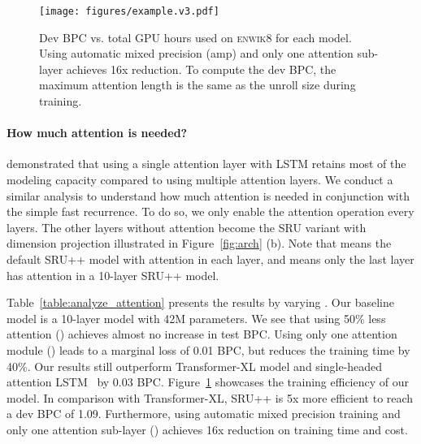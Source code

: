 \documentclass[11pt,a4paper]{article}
\begin{document}
\begin{figure}[t!]
\texttt{[image: figures/example.v3.pdf]}
    \caption{Dev BPC vs. total GPU hours used on \textsc{enwik8} for each model. 
Using automatic mixed precision (amp) and only one attention sub-layer achieves 16x reduction.
    To compute the dev BPC, the maximum attention length is the same as the unroll size  during training.}
    \label{fig:enwik8_base}
\end{figure}

\paragraph{How much attention is needed?}
\citet{merity2019single} demonstrated that using a single attention layer with LSTM retains most of the modeling capacity compared to using multiple attention layers.
We conduct a similar analysis to understand how much attention is needed in conjunction with the simple fast recurrence.
To do so, we only enable the attention operation every  layers.
The other layers without attention become the SRU variant with dimension projection illustrated in Figure~\ref{fig:arch} (b).
Note that  means the default SRU++ model with attention in each layer, and  means only the last layer has attention in a 10-layer SRU++ model.

Table~\ref{table:analyze_attention} presents the results by varying .
Our baseline model is a 10-layer model with 42M parameters.
We see that using 50\% less attention () achieves almost no increase in test BPC.
Using only one attention module () leads to a marginal loss of 0.01 BPC, but reduces the training time by 40\%. 
Our results still outperform Transformer-XL model and single-headed attention LSTM~\cite{merity2019single} by 0.03 BPC.
Figure~\ref{fig:enwik8_base} showcases the training efficiency of our model.
In comparison with Transformer-XL, SRU++ is 5x more efficient to reach a dev BPC of 1.09.
Furthermore, using automatic mixed precision training and only one attention sub-layer () achieves 16x reduction on training time and cost.
\end{document}
